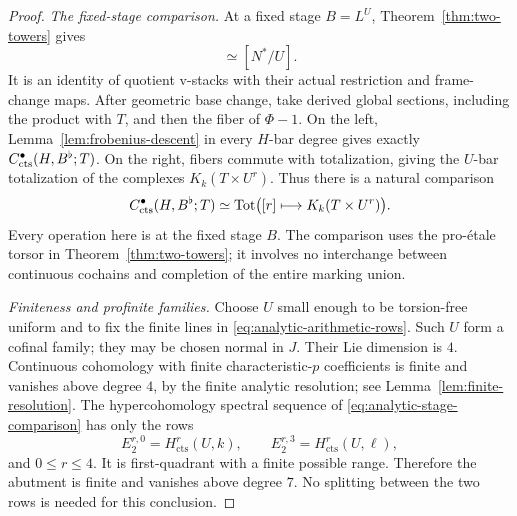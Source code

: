 \begin{proof}
\emph{The fixed-stage comparison.}
At a fixed stage \(B=L^U\), Theorem~\ref{thm:two-towers} gives
\begin{equation}
 [X_B/H]\simeq[N^\ast/U].
 \label{eq:analytic-fixed-stage-quotient}
\end{equation}
It is an identity of quotient v-stacks with their actual
restriction and frame-change maps.
After geometric base change, take derived global sections,
including the product with \(T\), and then the fiber of
\(\Phi-1\).
On the left,
Lemma~\ref{lem:frobenius-descent} in every \(H\)-bar degree gives
exactly \(C^\bullet_{\mathrm{cts}}(H,B^\flat;T)\).
On the right, fibers commute with totalization, giving the
\(U\)-bar totalization of the complexes \(K_k(T\times U^r)\).
Thus there is a natural comparison
\begin{equation}
 C^\bullet_{\mathrm{cts}}(H,B^\flat;T)
 \simeq
 \operatorname{Tot}\bigl([r]\longmapsto K_k(T\times U^r)\bigr).
 \label{eq:analytic-stage-comparison}
\end{equation}
Every operation here is at the fixed stage \(B\).
The comparison uses the pro-\'etale torsor in
Theorem~\ref{thm:two-towers}; it involves no interchange between
continuous cochains and completion of the entire marking union.

\smallskip\noindent\emph{Finiteness and profinite families.}
Choose \(U\) small enough to be torsion-free uniform and to fix the
finite lines in \eqref{eq:analytic-arithmetic-rows}.
Such \(U\) form a cofinal family; they may be chosen normal in
\(J\).
Their Lie dimension is \(4\).
Continuous cohomology with finite characteristic-\(p\)
coefficients is finite and vanishes above degree \(4\), by the
finite analytic resolution; see
Lemma~\ref{lem:finite-resolution}.
The hypercohomology spectral sequence of
\eqref{eq:analytic-stage-comparison} has only the rows
\begin{equation}
 E_2^{r,0}=H^r_{\mathrm{cts}}(U,k),\qquad
 E_2^{r,3}=H^r_{\mathrm{cts}}(U,\ell),
 \label{eq:analytic-stage-spectral-sequence}
\end{equation}
and \(0\leq r\leq4\).
It is first-quadrant with a finite possible range.
Therefore the abutment is finite and vanishes above degree \(7\).
No splitting between the two rows is needed for this conclusion.


\end{proof}
